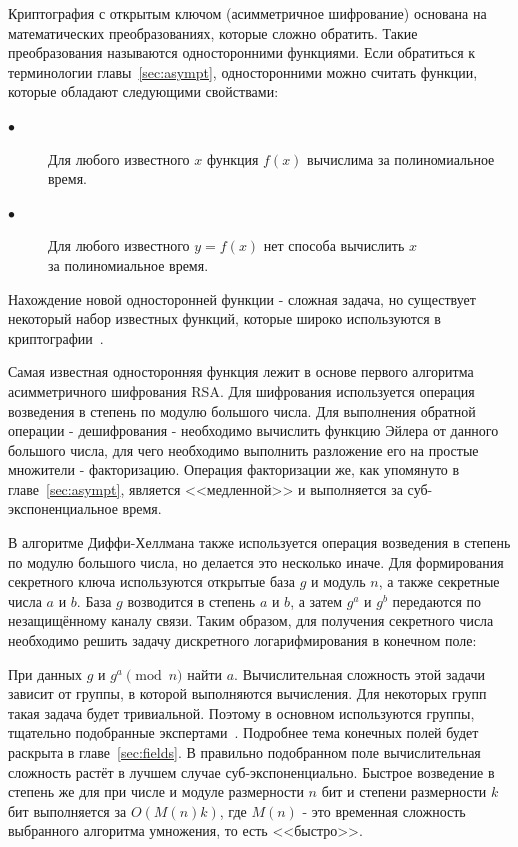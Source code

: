 \documentclass[times,specification,annotation]{itmo-student-thesis}
\begin{document}
Криптография с открытым ключом (асимметричное шифрование) основана на математических преобразованиях, которые сложно обратить.
Такие преобразования называются односторонними функциями.
Если обратиться к терминологии главы~\ref{sec:asympt}, односторонними можно считать функции, которые обладают следующими свойствами:
\begin{description}
  \item[$\bullet$] Для любого известного $x$ функция $f(x)$ вычислима за полиномиальное время.
  \item[$\bullet$] Для любого известного $y=f(x)$ нет способа вычислить $x$ \\за полиномиальное время.
\end{description}
Нахождение новой односторонней функции - сложная задача, но существует некоторый набор известных функций,
которые широко используются в криптографии~\cite{sma15, men01}.\par
Самая известная односторонняя функция лежит в основе первого алгоритма асимметричного шифрования RSA\@.
Для шифрования используется операция возведения в степень по модулю большого числа.
Для выполнения обратной операции - дешифрования - необходимо вычислить функцию Эйлера
от данного большого числа, для чего необходимо выполнить разложение его на простые множители - факторизацию.
Операция факторизации же, как упомянуто в главе~\ref{sec:asympt},  является <<медленной>>
и выполняется за суб-экспоненциальное время.\par
В алгоритме Диффи-Хеллмана также используется операция возведения в степень по модулю большого числа, но делается это несколько иначе.
Для формирования секретного ключа используются открытые база $g$ и модуль $n$, а также секретные числа $a$ и $b$.
База $g$ возводится в степень $a$ и $b$, а затем $g^a$ и $g^b$ передаются по незащищённому каналу связи.
Таким образом, для получения секретного числа необходимо решить задачу дискретного логарифмирования в конечном поле:\par
При данных $g$ и $g^a\pmod{n}$ найти $a$.
Вычислительная сложность этой задачи зависит от группы, в которой выполняются вычисления.
Для некоторых групп такая задача будет тривиальной.
Поэтому в основном используются группы, тщательно подобранные экспертами~\cite{rfc2412}.
Подробнее тема конечных полей будет раскрыта в главе~\ref{sec:fields}.
В правильно подобранном поле вычислительная сложность растёт в лучшем случае суб-экспоненциально.
Быстрое возведение в степень же для при числе и модуле размерности $n$ бит и степени размерности $k$ бит
выполняется за $O(M(n)k)$, где $M(n)$ - это временная сложность выбранного алгоритма умножения, то есть <<быстро>>.\par
\end{document}
